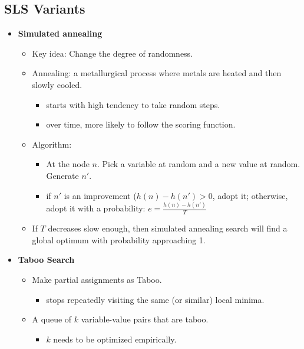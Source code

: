\documentclass{article}
\begin{document}
\subsection{SLS Variants}

\begin{itemize}
    \item \textbf{Simulated annealing}
        \begin{itemize}
            \item Key idea: Change the degree of randomness.
            \item Annealing: a metallurgical process where metals are heated and then slowly cooled.
                \begin{itemize}
                    \item starts with high tendency to take random steps.
                    \item over time, more likely to follow the scoring function.
                \end{itemize}
            \item Algorithm:
                \begin{itemize}
                    \item At the node $n$. Pick a variable at random and a new value at random. Generate $n'$.
                    \item if $n'$ is an improvement ($h(n) - h(n') > 0$, adopt it; otherwise, adopt it with a probability: $e = \frac{h(n) - h(n')}{T}$
                \end{itemize}
            \item If $T$ decreases slow enough, then simulated annealing search will find a global optimum with probability approaching 1.
        \end{itemize}
    \item \textbf{Taboo Search}
        \begin{itemize}
            \item Make partial assignments as Taboo.
            \begin{itemize}
                \item stops repeatedly visiting the same (or similar) local minima.
            \end{itemize}
            \item A queue of $k$ variable-value pairs that are taboo.
                \begin{itemize}
                    \item $k$ needs to be optimized empirically.

\end{itemize}
\end{itemize}
\end{itemize}
\end{document}
